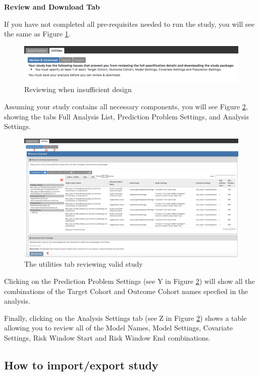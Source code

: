 \documentclass[11pt]{book}
\theoremstyle{definition}
\theoremstyle{definition}
\theoremstyle{definition}
\theoremstyle{remark}
\begin{document}
\textbf{Review and Download Tab}

If you have not completed all pre-requisites needed to run the study, you will see the same as Figure \ref{fig:insuf}.

\begin{figure}
\includegraphics[width=1\linewidth]{images/PatientLevelPrediction/atlasImplementation/utilities_review_insuf} \caption{Reviewing when insufficient design}\label{fig:insuf}
\end{figure}

Assuming your study contains all necessary components, you will see Figure \ref{fig:utilities}, showing the tabs Full Analysis List, Prediction Problem Settings, and Analysis Settings.

\begin{figure}
\includegraphics[width=1\linewidth]{images/PatientLevelPrediction/atlasImplementation/utilities_p1} \caption{The utilities tab reviewing valid study}\label{fig:utilities}
\end{figure}

Clicking on the Prediction Problem Settings (see Y in Figure \ref{fig:utilities}) will show all the combinations of the Target Cohort and Outcome Cohort names specfied in the analysis.

Finally, clicking on the Analysis Settings tab (see Z in Figure \ref{fig:utilities}) shows a table allowing you to review all of the Model Names, Model Settings, Covariate Settings, Risk Window Start and Risk Window End combinations.

\hypertarget{how-to-importexport-study}{%
\subsection{How to import/export study}\label{how-to-importexport-study}}
\end{document}
